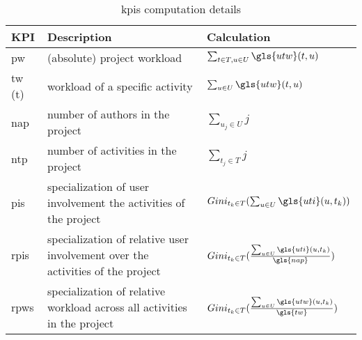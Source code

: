 \begin{table}[]
\setlength\belowcaptionskip{-20pt}
\centering
\caption{\glspl{kpi} computation details}
\label{tab:kpis-computation}
\begin{tabular}{@{}m{1.5cm}m{6cm}m{4cm}@{}}
\toprule
\textbf{KPI} & \textbf{Description}                           & \textbf{Calculation}                     \\ \midrule
\gls{pw}     & (absolute) project workload                    & $\sum_{t \in T, u \in U} \gls{utw}(t,u)$ \\
\gls{tw} (t) & workload of a specific activity  & $\sum_{u \in U} \gls{utw}(t,u) $         \\
\gls{nap}    & number of authors in the project               & $\sum_{u_j \in U} j$                     \\
\gls{ntp}    & number of activities in the project         & $\sum_{t_j \in T} j$                     \\
\gls{pis}  & specialization of user involvement the activities of the project               & $Gini_{{t_k} \in T} (\sum_{u \in U}\gls{uti}(u, t_k))$                \\
\gls{rpis} & specialization of relative user involvement over the activities of the project & $Gini_{{t_k} \in T} ( \frac{\sum_{u \in U} \gls{uti}(u, t_k)}{ \gls{nap}} ) $ \\
\gls{rpws} & specialization of relative workload across all activities in the project       & $Gini_{{t_k} \in T} ( \frac {\sum_{u \in U} \gls{utw}(u, t_k) } { \gls{tw}})$  \\ \bottomrule
\end{tabular}%
\end{table}